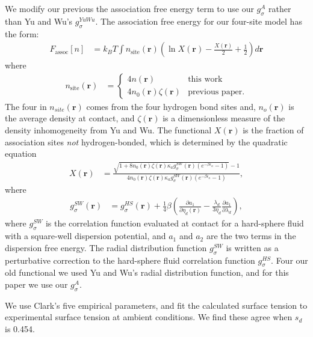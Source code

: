 \documentclass[twocolumn,amsmath,amssymb,prl]{revtex4-1}
\newcommand{\rr}{\textbf{r}}
\newcommand{\xx}{\textbf{r}}
\newcommand\etadisp{\ensuremath{\eta_\textit{d}}}
\newcommand\epsilonassoc{\ensuremath{\epsilon_\textit{a}}}
\newcommand\kappaassoc{\ensuremath{\kappa_\textit{a}}}
\newcommand\lambdadisp{\ensuremath{\lambda_\textit{d}}}
\newcommand\lscale{\ensuremath{s_d}}
\begin{document}
We modify our previous the association free energy term to use our
$g_{\sigma}^A$ rather than Yu and Wu's $g_\sigma^{YuWu}$.  The
association free energy for our four-site model has the form:
\begin{align}
  F_\text{assoc}[n] &= k_BT \int n_\text{site}(\xx)
  \left(\ln X(\xx) - \frac{X(\xx)}{2} + \frac12\right) d\xx
\end{align}
where
\begin{align}
  n_\text{site}(\rr) &=
  \begin{cases}
    4 n(\rr) & \text{this work}\\
    4 n_0(\rr) \zeta(\rr) & \text{previous paper}.
  \end{cases} 
\end{align}
The four in $n_{site}(\rr)$ comes from the four hydrogen bond sites
and, $n_o(\rr)$ is the average density at contact, and $\zeta(\xx)$ is
a dimensionless measure of the density inhomogeneity from Yu and
Wu. \cite{yu2002fmt-dft-inhomogeneous-associating} The functional
$X(\rr)$ is the fraction of association sites \emph{not}
hydrogen-bonded, which is determined by the quadratic equation
\begin{align}
  X(\xx) &= \frac{\sqrt{1 + 8n_0(\xx)\zeta(\xx)
      \kappaassoc g^\textit{SW}_\sigma(\xx)
  \left(e^{-\beta\epsilonassoc} - 1\right)} - 1}
  {4 n_0(\xx)\zeta(\xx)
    \kappaassoc g^\textit{SW}_\sigma(\xx)
  \left(e^{-\beta\epsilonassoc} - 1\right)}, \label{eq:X}
\end{align}
where
\begin{align}
  g^\textit{SW}_\sigma(\xx) &= g^\textit{HS}_\sigma(\xx) +
  \frac{1}{4}\beta\left(\frac{\partial a_1}{\partial \etadisp(\xx)} -
  \frac{\lambdadisp}{3 \etadisp}\frac{\partial a_1}{\partial \lambdadisp}\right)\label{eq:gSW},
\end{align}
where $g^\textit{SW}_\sigma$ is the correlation function evaluated at
contact for a hard-sphere fluid with a square-well dispersion
potential, and $a_1$ and $a_2$ are the two terms in the dispersion
free energy.  The radial distribution function $g^\textit{SW}_\sigma$ is
written as a perturbative correction to the hard-sphere fluid
correlation function $g^\textit{HS}_\sigma$. Four our old functional
we used Yu and Wu's radial distribution function, and for this paper we
use our $g^\textit{A}_\sigma$.

We use Clark's five empirical parameters, and fit the calculated
surface tension to experimental surface tension at ambient conditions.
We find these agree when $\lscale$ is 0.454.
\end{document}
